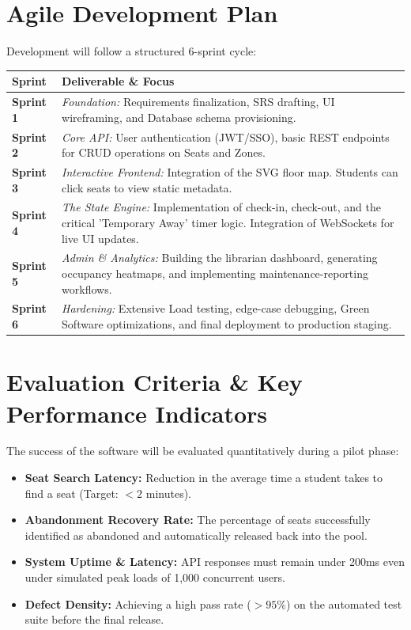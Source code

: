 \documentclass[11pt,a4paper]{article}
\begin{document}
\section{Agile Development Plan}
Development will follow a structured 6-sprint cycle:

\begin{center}
\begin{tabularx}{\textwidth}{p{}X}
\toprule
\textbf{Sprint} & \textbf{Deliverable \& Focus} \\
\midrule
\textbf{Sprint 1} & \textit{Foundation:} Requirements finalization, SRS drafting, UI wireframing, and Database schema provisioning. \\
\textbf{Sprint 2} & \textit{Core API:} User authentication (JWT/SSO), basic REST endpoints for CRUD operations on Seats and Zones. \\
\textbf{Sprint 3} & \textit{Interactive Frontend:} Integration of the SVG floor map. Students can click seats to view static metadata. \\
\textbf{Sprint 4} & \textit{The State Engine:} Implementation of check-in, check-out, and the critical 'Temporary Away' timer logic. Integration of WebSockets for live UI updates. \\
\textbf{Sprint 5} & \textit{Admin \& Analytics:} Building the librarian dashboard, generating occupancy heatmaps, and implementing maintenance-reporting workflows. \\
\textbf{Sprint 6} & \textit{Hardening:} Extensive Load testing, edge-case debugging, Green Software optimizations, and final deployment to production staging. \\
\bottomrule
\end{tabularx}
\end{center}

\section{Evaluation Criteria \& Key Performance Indicators}
The success of the software will be evaluated quantitatively during a pilot phase:
\begin{itemize}[leftmargin=0.7cm]
    \item \textbf{Seat Search Latency:} Reduction in the average time a student takes to find a seat (Target: $< 2$ minutes).
    \item \textbf{Abandonment Recovery Rate:} The percentage of seats successfully identified as abandoned and automatically released back into the pool.
    \item \textbf{System Uptime \& Latency:} API responses must remain under 200ms even under simulated peak loads of 1,000 concurrent users.
    \item \textbf{Defect Density:} Achieving a high pass rate ($>95\%$) on the automated test suite before the final release.
\end{itemize}
\end{document}
